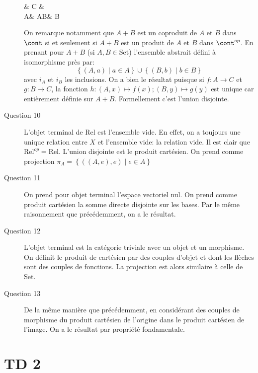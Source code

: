 \documentclass[math]{cours}
\begin{document}
\begin{description}
\begin{category}[]
			& C &\\
			A\arrow[ur, "f"]\arrow[r, "i_{A}" swap] & A\bigsqcup B\arrow[dashed, "h", u] & B\arrow[ul, "g" swap]\arrow[l, "i_{2}"]
		\end{category}
		On remarque notamment que $A + B$ est un coproduit de $A$ et $B$ dans $\cont$ si et seulement si $A + B$ est un produit de $A$ et $B$ dans $\cont^{op}$.
		En prenant pour $A + B$ (si $A, B \in \mathrm{Set}$) l'ensemble abstrait défini à isomorphisme près par:
		\begin{equation*}
			\left\{ (A, a) \mid a\in A \right\} \cup \left\{ (B, b) \mid b \in B \right\}
		\end{equation*}
		avec $i_{A}$ et $i_{B}$ les inclusions.
		On a bien le résultat puisque si $f: A \to C$ et $g: B\to C$, la fonction $h: (A, x) \mapsto f(x); (B, y) \mapsto g(y)$ est unique car entièrement définie sur $A + B$.
		Formellement c'est l'union disjointe.
	\item[Question 10] L'objet terminal de $\mathrm{Rel}$ est l'ensemble vide. En effet, on a toujours une unique relation entre $X$ et l'ensemble vide: la relation vide.
		Il est clair que $\mathrm{Rel}^{op} = \mathrm{Rel}$.
		L'union disjointe est le produit cartésien.
		On prend comme projection $\pi_{A} = \left\{ \left( (A, e), e \right)\mid e \in A \right\}$
	\item[Question 11] On prend pour objet terminal l'espace vectoriel nul.
		On prend comme produit cartésien la somme directe disjointe sur les bases.
		Par le même raisonnement que précédemment, on a le résultat.
	\item[Question 12] L'objet terminal est la catégorie triviale avec un objet et un morphisme.
		On définit le produit de cartésien par des couples d'objet et dont les flèches sont des couples de fonctions.
		La projection est alors similaire à celle de $\mathrm{Set}$.
	\item[Question 13] De la même manière que précédemment, en considérant des couples de morphisme du produit cartésien de l'origine dans le produit cartésien de l'image.
		On a le résultat par propriété fondamentale.
\end{description}



\section{TD 2}
\end{document}
